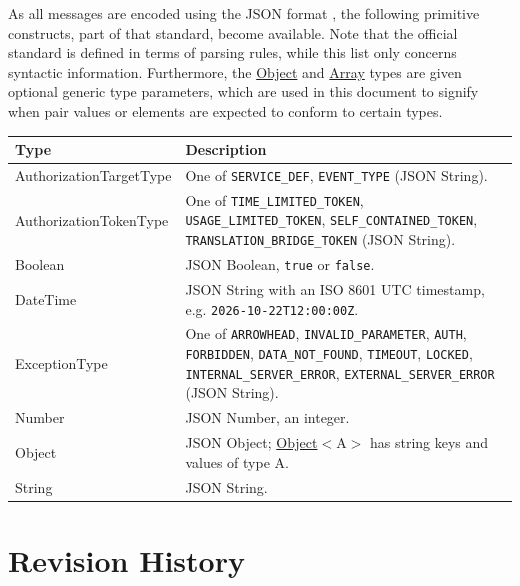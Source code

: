 \documentclass[a4paper]{arrowhead}
\newcommand{\pdef}[1]{{\textcolor{ArrowheadGrey}{#1 \label{sec:model:primitives:#1} \label{sec:model:primitives:#1s}}}}
\newcommand{\pref}[1]{{\textcolor{ArrowheadGrey}{\hyperref[sec:model:primitives:#1]{#1}}}}
\begin{document}
As all messages are encoded using the JSON format \cite{rfc8259}, the following primitive constructs, part of that standard, become available.
Note that the official standard is defined in terms of parsing rules, while this list only concerns syntactic information.
Furthermore, the \pref{Object} and \pref{Array} types are given optional generic type parameters, which are used in this document to signify when pair values or elements are expected to conform to certain types.

\noindent\begin{tabularx}{\textwidth}{| p{4.6cm} | X |} \hline
\rowcolor{gray!33} Type & Description \\ \hline
\pdef{AuthorizationTargetType} & One of \texttt{SERVICE\_\allowbreak{}DEF}, \texttt{EVENT\_\allowbreak{}TYPE} (JSON String). \\ \hline
\pdef{AuthorizationTokenType} & One of \texttt{TIME\_\allowbreak{}LIMITED\_\allowbreak{}TOKEN}, \texttt{USAGE\_\allowbreak{}LIMITED\_\allowbreak{}TOKEN}, \texttt{SELF\_\allowbreak{}CONTAINED\_\allowbreak{}TOKEN}, \texttt{TRANSLATION\_\allowbreak{}BRIDGE\_\allowbreak{}TOKEN} (JSON String). \\ \hline
\pdef{Boolean} & JSON Boolean, \texttt{true} or \texttt{false}. \\ \hline
\pdef{DateTime} & JSON String with an ISO 8601 UTC timestamp, e.g. \texttt{2026-10-22T12:00:00Z}. \\ \hline
\pdef{ExceptionType} & One of \texttt{ARROWHEAD}, \texttt{INVALID\_\allowbreak{}PARAMETER}, \texttt{AUTH}, \texttt{FORBIDDEN}, \texttt{DATA\_\allowbreak{}NOT\_\allowbreak{}FOUND}, \texttt{TIMEOUT}, \texttt{LOCKED}, \texttt{INTERNAL\_\allowbreak{}SERVER\_\allowbreak{}ERROR}, \texttt{EXTERNAL\_\allowbreak{}SERVER\_\allowbreak{}ERROR} (JSON String). \\ \hline
\pdef{Number} & JSON Number, an integer. \\ \hline
\pdef{Object} & JSON Object; \pref{Object}$<$A$>$ has string keys and values of type A. \\ \hline
\pdef{String} & JSON String. \\ \hline
\end{tabularx}

\newpage




\newpage

\section{Revision History}
\end{document}
